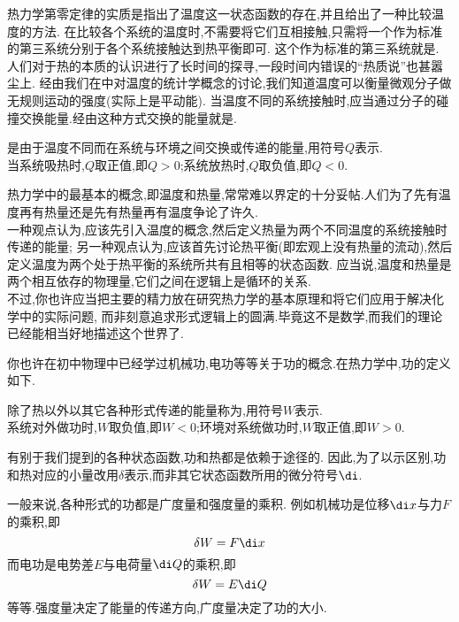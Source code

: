 \documentclass{ctexart}
\begin{document}
热力学第零定律的实质是指出了温度这一状态函数的存在,并且给出了一种比较温度的方法.%
在比较各个系统的温度时,不需要将它们互相接触,只需将一个作为标准的第三系统分别于各个系统接触达到热平衡即可.%
这个作为标准的第三系统就是.\\
\indent 人们对于热的本质的认识进行了长时间的探寻,一段时间内错误的“热质说”也甚嚣尘上.%
经由我们在中对温度的统计学概念的讨论,我们知道温度可以衡量微观分子做无规则运动的强度(实际上是平动能).%
当温度不同的系统接触时,应当通过分子的碰撞交换能量.经由这种方式交换的能量就是.
\begin{definition}[2A.2.3 热]
    是由于温度不同而在系统与环境之间交换或传递的能量,用符号$Q$表示.\\
    当系统吸热时,$Q$取正值,即$Q>0$;系统放热时,$Q$取负值,即$Q<0$.
\end{definition}
\begin{hint}
    热力学中的最基本的概念,即温度和热量,常常难以界定的十分妥帖.人们为了先有温度再有热量还是先有热量再有温度争论了许久.\\
    一种观点认为,应该先引入温度的概念,然后定义热量为两个不同温度的系统接触时传递的能量;%
    另一种观点认为,应该首先讨论热平衡(即宏观上没有热量的流动),然后定义温度为两个处于热平衡的系统所共有且相等的状态函数.%
    应当说,温度和热量是两个相互依存的物理量,它们之间在逻辑上是循环的关系.\\
    不过,你也许应当把主要的精力放在研究热力学的基本原理和将它们应用于解决化学中的实际问题,%
    而非刻意追求形式逻辑上的圆满.毕竟这不是数学,而我们的理论已经能相当好地描述这个世界了.
\end{hint}
\vspace{8pt}
\indent 你也许在初中物理中已经学过机械功,电功等等关于功的概念.在热力学中,功的定义如下.
\begin{definition}[2A.3.1 功]
    除了热以外以其它各种形式传递的能量称为,用符号$W$表示.\\
    系统对外做功时,$W$取负值,即$W<0$;环境对系统做功时,$W$取正值,即$W>0$.
\end{definition}
\begin{hint}
    有别于我们提到的各种状态函数,功和热都是依赖于途径的.%
    因此,为了以示区别,功和热对应的小量改用$\delta$表示,而非其它状态函数所用的微分符号$\di$.
\end{hint}
一般来说,各种形式的功都是广度量和强度量的乘积.%
例如机械功是位移$\di x$与力$F$的乘积,即
\[\delta W=F\di x\]
而电功是电势差$E$与电荷量$\di Q$的乘积,即
\[\delta W=E\di Q\]
等等.强度量决定了能量的传递方向,广度量决定了功的大小.\\
\end{document}

